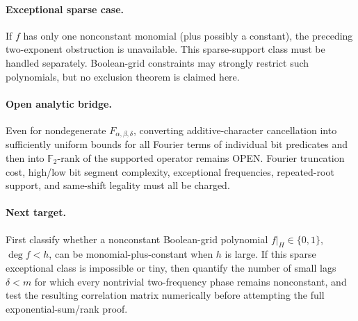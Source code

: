 \documentclass[11pt]{article}\usepackage[margin=.88in]{geometry}\usepackage{amsmath,amssymb}
\begin{document}
\paragraph{Exceptional sparse case.}
If \(f\) has only one nonconstant monomial (plus possibly a constant), the preceding two-exponent obstruction is unavailable. This sparse-support class must be handled separately. Boolean-grid constraints may strongly restrict such polynomials, but no exclusion theorem is claimed here.
\paragraph{Open analytic bridge.}
Even for nondegenerate \(F_{\alpha,\beta,\delta}\), converting additive-character cancellation into sufficiently uniform bounds for all Fourier terms of individual bit predicates and then into \(\mathbb F_2\)-rank of the supported operator remains OPEN. Fourier truncation cost, high/low bit segment complexity, exceptional frequencies, repeated-root support, and same-shift legality must all be charged.
\paragraph{Next target.}
First classify whether a nonconstant Boolean-grid polynomial \(f|_H\in\{0,1\}\), \(\deg f<h\), can be monomial-plus-constant when \(h\) is large. If this sparse exceptional class is impossible or tiny, then quantify the number of small lags \(\delta<m\) for which every nontrivial two-frequency phase remains nonconstant, and test the resulting correlation matrix numerically before attempting the full exponential-sum/rank proof.
\end{document}
